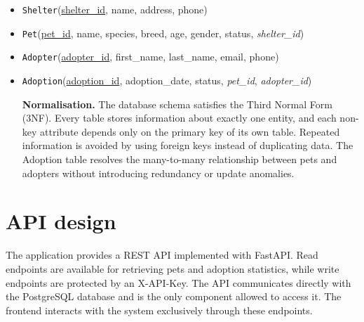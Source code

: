 \documentclass[11pt,a4paper]{article}
\begin{document}
\begin{itemize}
\item \texttt{Shelter}(\underline{shelter\_id}, name, address, phone)

\item \texttt{Pet}(\underline{pet\_id}, name, species, breed, age, gender,
status, \emph{shelter\_id})

\item \texttt{Adopter}(\underline{adopter\_id}, first\_name, last\_name,
email, phone)

\item \texttt{Adoption}(\underline{adoption\_id},
adoption\_date, status,
\emph{pet\_id},
\emph{adopter\_id})

\textbf{Normalisation.}
The database schema satisfies the Third Normal Form (3NF). Every table stores
information about exactly one entity, and each non-key attribute depends only on
the primary key of its own table. Repeated information is avoided by using
foreign keys instead of duplicating data. The Adoption table resolves the
many-to-many relationship between pets and adopters without introducing
redundancy or update anomalies.

\end{itemize}


\section{API design}

The application provides a REST API implemented with FastAPI. Read endpoints are
available for retrieving pets and adoption statistics, while write endpoints are
protected by an X-API-Key. The API communicates directly with the PostgreSQL
database and is the only component allowed to access it. The frontend interacts
with the system exclusively through these endpoints.
\end{document}
